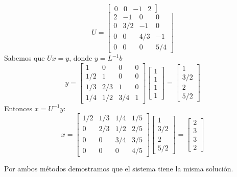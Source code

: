 \begin{itemize}
\[\begin{bmatrix}
    		0 & 0 & -1 & 2  
  			\end{bmatrix}
  			\]
  			\[ U =   			
  			\begin{bmatrix}
   			 2 & -1 & 0 & 0 \\ 
    		 0 & 3/2 & -1 & 0 \\
    		 0 & 0 & 4/3 & -1 \\
    		 0 & 0 & 0 & 5/4  
  			\end{bmatrix}
  			\]
  			Sabemos que $Ux = y$, donde  $y = L^{-1}b$
  			\[ y =   			
  			\begin{bmatrix}
   			 1 & 0 & 0 & 0 \\ 
    		 1/2 & 1 & 0 & 0 \\
    		 1/3 & 2/3 & 1 & 0 \\
    		 1/4 & 1/2 & 3/4 & 1  
  			\end{bmatrix}
  			\begin{bmatrix}
   			 1  \\ 
    		 1 \\
    		 1 \\
    		 1  
  			\end{bmatrix}
  			=
  			\begin{bmatrix}
   			 1 \\ 
    		 3/2 \\
    		 2 \\
    		 5/2  
  			\end{bmatrix}
  			\] 
  			Entonces $x = U^{-1}y$:		
  			\[ x =   			
  			\begin{bmatrix}
   			 1/2 & 1/3 & 1/4 & 1/5 \\ 
    		 0 & 2/3 & 1/2 & 2/5 \\
    		 0 & 0 & 3/4 & 3/5 \\
    		 0 & 0 & 0 & 4/5  
  			\end{bmatrix}
  			\begin{bmatrix}
   			 1  \\ 
    		 3/2 \\
    		 2 \\
    		 5/2  
  			\end{bmatrix}
  			=
  			\begin{bmatrix}
   			 2 \\ 
    		 3 \\
    		 3 \\
    		 2  
  			\end{bmatrix}
  			\] 
	\end{itemize}
	Por ambos métodos demostramos que el sistema tiene la misma solución.